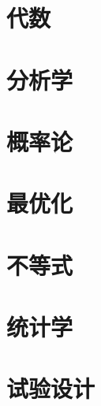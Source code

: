 \documentclass[11pt, a4paper, twoside, openany, UTF8]{ctexbook}
\begin{document}
\maketitle
\frontmatter	
\listoftodos

\tableofcontents

\mainmatter
\part{代数}


\part{分析学}










\part{概率论}



\part{最优化}


\part{不等式}

\part{统计学}








\part{试验设计}

\end{document}
